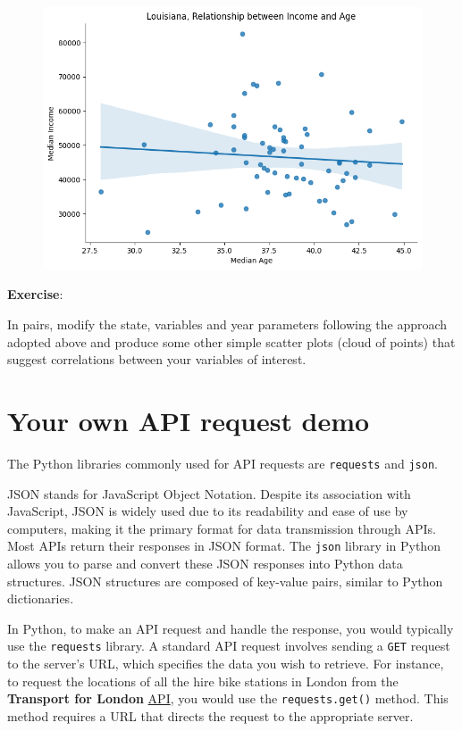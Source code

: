 \documentclass[
  letterpaper,
  DIV=11,
  numbers=noendperiod]{scrreprt}
\begin{document}
\begin{figure}[H]

{\centering \includegraphics{labs/w03_webArch_files/figure-pdf/cell-12-output-1.png}

}

\end{figure}

\textbf{Exercise}:

In pairs, modify the state, variables and year parameters following the
approach adopted above and produce some other simple scatter plots
(cloud of points) that suggest correlations between your variables of
interest.

\hypertarget{your-own-api-request-demo}{%
\section{Your own API request demo}\label{your-own-api-request-demo}}

The Python libraries commonly used for API requests are
\texttt{requests} and \texttt{json}.

JSON stands for JavaScript Object Notation. Despite its association with
JavaScript, JSON is widely used due to its readability and ease of use
by computers, making it the primary format for data transmission through
APIs. Most APIs return their responses in JSON format. The \texttt{json}
library in Python allows you to parse and convert these JSON responses
into Python data structures. JSON structures are composed of key-value
pairs, similar to Python dictionaries.

In Python, to make an API request and handle the response, you would
typically use the \texttt{requests} library. A standard API request
involves sending a \texttt{GET} request to the server's URL, which
specifies the data you wish to retrieve. For instance, to request the
locations of all the hire bike stations in London from the
\textbf{Transport for London} \href{https://api.tfl.gov.uk}{API}, you
would use the \texttt{requests.get()} method. This method requires a URL
that directs the request to the appropriate server.
\end{document}
